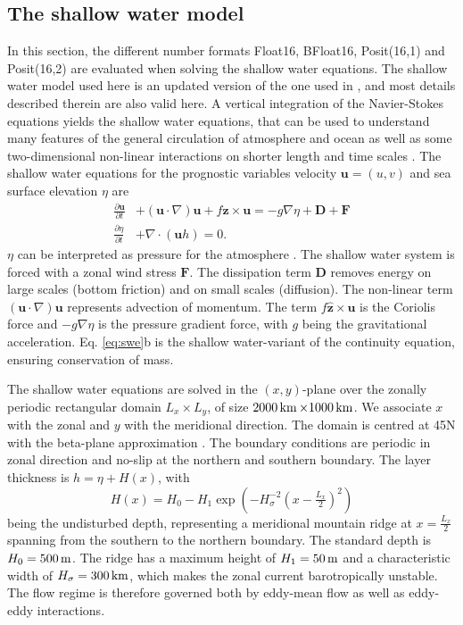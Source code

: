 \subsection{The shallow water model}

In this section, the different number formats Float16, BFloat16, Posit(16,1) and
Posit(16,2) are evaluated when solving the shallow water equations. The shallow
water model used here is an updated version of the one used in \cite{Klower2019a},
and most details described therein are also valid here. A vertical integration of
the Navier-Stokes equations yields the shallow water equations, that can be used
to understand many features of the general circulation of atmosphere and ocean as
well as some two-dimensional non-linear interactions on shorter length and time scales
\citep{Gill1982,Vallis2006}. The shallow water equations for the prognostic variables
velocity $\mathbf{u} = (u,v)$ and sea surface elevation $\eta$ are
\begin{subequations}
\begin{align}
\frac{\partial \mathbf{u}}{\partial t} &+ (\mathbf{u} \cdot \nabla) \mathbf{u} +
f\hat{\mathbf{z}} \times \mathbf{u} = -g\nabla \eta + \mathbf{D} + \mathbf{F} \\
\frac{\partial \eta}{\partial t} &+ \nabla \cdot (\mathbf{u}h) = 0.
\end{align}
\label{eq:swe}%
\end{subequations}
$\eta$ can be interpreted as pressure for the atmosphere \citep{Gill1982}.
The shallow water system is forced with a zonal wind stress $\mathbf{F}$.
The dissipation term $\mathbf{D}$ removes energy on large scales (bottom friction)
and on small scales (diffusion). The non-linear term $(\mathbf{u} \cdot \nabla) \mathbf{u}$
represents advection of momentum. The term $f\hat{\mathbf{z}} \times \mathbf{u}$
is the Coriolis force and $-g\nabla \eta$ is the pressure gradient force, with
$g$ being the gravitational acceleration. Eq. \ref{eq:swe}b is the shallow
water-variant of the continuity equation, ensuring conservation of mass.

The shallow water equations are solved in the $(x,y)$-plane over the zonally periodic
rectangular domain $L_x \times L_y$, of size $2000\operatorname{km} \times 1000\operatorname{km}$.
We associate $x$ with the zonal and $y$ with the meridional direction. The domain
is centred at 45N with the beta-plane approximation \citep{Vallis2006}. The boundary
conditions are periodic in zonal direction and no-slip at the northern and southern
boundary. The layer thickness is $h = \eta + H(x)$, with
\begin{equation}
H(x) = H_0 - H_1\exp\left(-H_\sigma^{-2}(x-\tfrac{L_x}{2})^2\right)
\end{equation}
being the undisturbed depth, representing a meridional mountain ridge at
$x=\tfrac{L_x}{2}$ spanning from the southern to the northern boundary.
The standard depth is $H_0 = 500\operatorname{m}$. The ridge has a maximum height of
$H_1 = 50\operatorname{m}$ and a characteristic width of $H_\sigma = 300\operatorname{km}$, which
makes the zonal current barotropically unstable. The flow regime is therefore
governed both by eddy-mean flow as well as eddy-eddy interactions.

